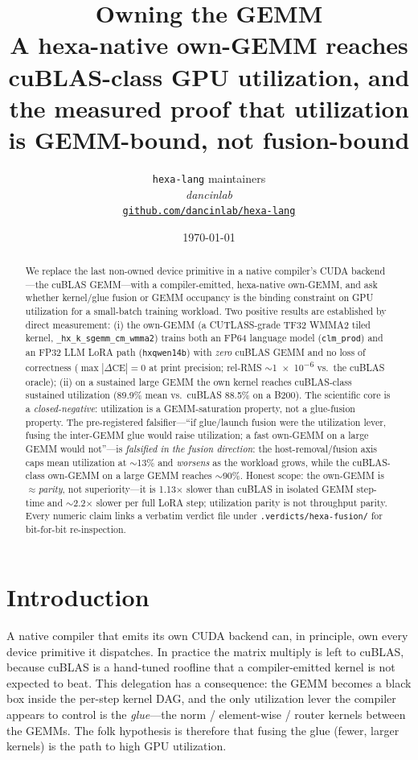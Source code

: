 \documentclass[11pt,a4paper]{article}
\title{
  \textbf{Owning the GEMM}\\[4pt]
  \large A hexa-native own-GEMM reaches cuBLAS-class GPU utilization, and the
  measured proof that utilization is GEMM-bound, not fusion-bound
}
\author{
  \texttt{hexa-lang} maintainers\\
  \normalsize\textit{dancinlab}\\[2pt]
  \normalsize\href{https://github.com/dancinlab/hexa-lang}{\texttt{github.com/dancinlab/hexa-lang}}
}
\date{\today}
\begin{document}
\maketitle

\begin{abstract}
We replace the last non-owned device primitive in a native compiler's CUDA
backend---the cuBLAS GEMM---with a compiler-emitted, hexa-native own-GEMM, and
ask whether kernel/glue fusion or GEMM occupancy is the binding constraint on
GPU utilization for a small-batch training workload. Two positive results are
established by direct measurement: (i) the own-GEMM (a CUTLASS-grade TF32 WMMA2
tiled kernel, \texttt{\_hx\_k\_sgemm\_cm\_wmma2}) trains both an FP64 language model
(\texttt{clm\_prod}) and an FP32 LLM LoRA path (\texttt{hxqwen14b}) with
\emph{zero} cuBLAS GEMM and no loss of correctness ($\max|\Delta\mathrm{CE}|=0$ at
print precision; rel-RMS $\sim$\SI{1e-6}{} vs.\ the cuBLAS oracle); (ii) on a
sustained large GEMM the own kernel reaches cuBLAS-class sustained utilization
(89.9\% mean vs.\ cuBLAS 88.5\% on a B200). The scientific core is a
\emph{closed-negative}: utilization is a GEMM-saturation property, not a
glue-fusion property. The pre-registered falsifier---``if glue/launch fusion
were the utilization lever, fusing the inter-GEMM glue would raise utilization;
a fast own-GEMM on a large GEMM would not''---is \emph{falsified in the fusion
direction}: the host-removal/fusion axis caps mean utilization at $\sim$13\% and
\emph{worsens} as the workload grows, while the cuBLAS-class own-GEMM on a large
GEMM reaches $\sim$90\%. Honest scope: the own-GEMM is $\approx$\emph{parity},
not superiority---it is 1.13$\times$ slower than cuBLAS in isolated GEMM
step-time and $\sim$2.2$\times$ slower per full LoRA step; utilization parity is
not throughput parity. Every numeric claim links a verbatim verdict file under
\texttt{.verdicts/hexa-fusion/} for bit-for-bit re-inspection.
\end{abstract}

\section{Introduction}
\label{sec:intro}

A native compiler that emits its own CUDA backend can, in principle, own every
device primitive it dispatches. In practice the matrix multiply is left to
cuBLAS, because cuBLAS is a hand-tuned roofline that a compiler-emitted kernel is
not expected to beat. This delegation has a consequence: the GEMM becomes a black
box inside the per-step kernel DAG, and the only utilization lever the compiler
appears to control is the \emph{glue}---the norm / element-wise / router kernels
between the GEMMs. The folk hypothesis is therefore that fusing the glue (fewer,
larger kernels) is the path to high GPU utilization.
\end{document}
